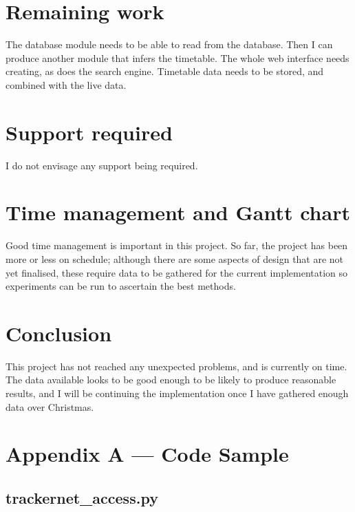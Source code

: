 \documentclass[a4paper,12pt]{article}
\begin{document}
\section{Remaining work}

The database module needs to be able to read from the database. Then I can
produce another module that infers the timetable. The whole web interface needs
creating, as does the search engine. Timetable data needs to be stored, and
combined with the live data.

\section{Support required}

I do not envisage any support being required.

\section{Time management and Gantt chart}

Good time management is important in this project. So far, the project has been
more or less on schedule; although there are some aspects of design that are
not yet finalised, these require data to be gathered for the current
implementation so experiments can be run to ascertain the best methods.



\section{Conclusion}

This project has not reached any unexpected problems, and is currently on time.
The data available looks to be good enough to be likely to produce reasonable
results, and I will be continuing the implementation once I have gathered
enough data over Christmas.

\pagebreak





\section*{Appendix A --- Code Sample}

\subsection*{trackernet\_access.py}


\end{document}
